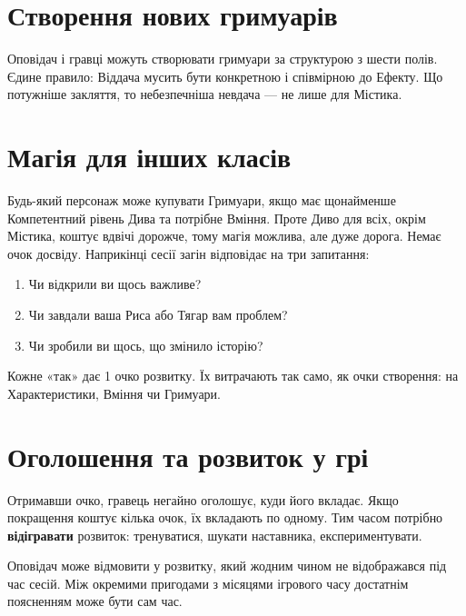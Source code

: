 \documentclass[10pt,a4paper]{article}
\begin{document}
\section*{Створення нових гримуарів}
Оповідач і гравці можуть створювати гримуари за структурою з шести полів. Єдине правило: Віддача мусить бути конкретною і співмірною до Ефекту. Що потужніше закляття, то небезпечніша невдача — не лише для Містика.
\section*{Магія для інших класів}
Будь-який персонаж може купувати Гримуари, якщо має щонайменше Компетентний рівень Дива та потрібне Вміння. Проте Диво для всіх, окрім Містика, коштує вдвічі дорожче, тому магія можлива, але дуже дорога.
Немає очок досвіду. Наприкінці сесії загін відповідає на три запитання:
\begin{enumerate}[leftmargin=*,itemsep=2pt]
\item Чи відкрили ви щось важливе?
\item Чи завдали ваша Риса або Тягар вам проблем?
\item Чи зробили ви щось, що змінило історію?
\end{enumerate}
Кожне «так» дає 1 очко розвитку. Їх витрачають так само, як очки створення: на Характеристики, Вміння чи Гримуари.
\section*{Оголошення та розвиток у грі}
Отримавши очко, гравець негайно оголошує, куди його вкладає. Якщо покращення коштує кілька очок, їх вкладають по одному. Тим часом потрібно \textbf{відігравати} розвиток: тренуватися, шукати наставника, експериментувати.

Оповідач може відмовити у розвитку, який жодним чином не відображався під час сесій. Між окремими пригодами з місяцями ігрового часу достатнім поясненням може бути сам час.
\end{document}
